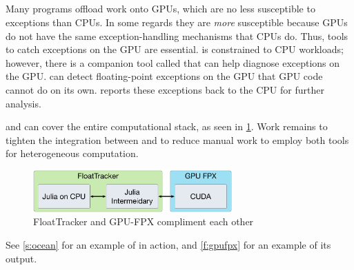 \documentclass{juliacon}
\begin{document}
\subsection{\GPUFPX{}}
\label{s:gpufpx}


Many programs offload work onto GPUs, which are no less susceptible to \fp{} exceptions than CPUs.
In some regards they are \emph{more} susceptible because GPUs do not have the same exception-handling mechanisms that CPUs do.
Thus, tools to catch \fp{} exceptions on the GPU are essential.
\FT{} is constrained to CPU workloads; however, there is a companion tool called \GPUFPX{}\cite{llsflg-hpdc-2023} that can help diagnose \fp{} exceptions on the GPU.
\GPUFPX{} can detect floating-point exceptions on the GPU that GPU code cannot do on its own.
\GPUFPX{} reports these exceptions back to the CPU for further analysis.

\FT{} and \GPUFPX{} can cover the entire computational stack, as seen in \cref{fig:ft_and_gpu_fpx}.
Work remains to tighten the integration between \FT{} and \GPUFPX{} to reduce manual work to employ both tools for heterogeneous computation.

\begin{figure}
  \centering
  \includegraphics[width=3in]{./fig/float_tracker_context_boxes.png}
  \caption{FloatTracker and GPU-FPX compliment each other}
  \label{fig:ft_and_gpu_fpx}
\end{figure}

See \cref{s:ocean} for an example of \GPUFPX{} in action, and \ref{f:gpufpx} for an example of its output.


\end{document}
